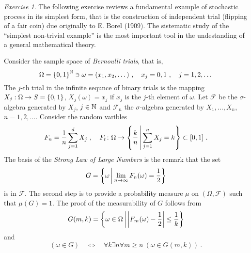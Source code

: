 \documentclass[12pt,a4paper]{amsart}
\theoremstyle{plain}
\theoremstyle{definition}
\theoremstyle{remark}
\newtheorem{exercise}[theorem]{Exercise}
\begin{document}
  \begin{exercise} The following exercise reviews a fundamental
    example of stochastic process in its simplest form, that is the
    construction of independent trial (flipping of a fair coin) due
    originally to E. Borel (1909). The sistematic study of the
    ``simplest non-trivial example'' is the most important tool in the
    undestanding of a general mathematical theory.

    Consider the sample space of \emph{Bernoulli trials}, that is,
    \begin{equation*}
      \Omega = \left\{0,1\right\}^{\mathbb{N}} \ni \omega = (x_1,x_2, \dots) \ ,
      \quad x_j = 0,1 \ , \quad j=1,2,\dots
    \end{equation*}
    The $j$-th trial in the infinite sequnce of binary trials is the
    mapping $X_j : \Omega \to S=\left\{0,1\right\}$, $X_j(\omega) = x_j$ if
    $x_j$ is the $j$-th element of $\omega$. Let $\mathcal F$ be the
    $\sigma$-algebra generated by $X_j$, $j \in \mathbb{N}$ and
    $\mathcal F_n$ the $\sigma$-algebra generated by $X_1,\dots,X_n$,
    $n=1,2,\dots$. Consider the random varibles
    \begin{equation*}
      F_n = \frac 1 n \sum_{j=1}^d X_j \ , \quad F_t \colon \Omega \to
      \left\{\frac k n \, \middle| \, \sum_{j=1}^n X_j = k \right\} \subset [0,1] \ .
    \end{equation*}
    The basis of the \emph{Strong Law of Large Numbers} is the remark
    that the set
\begin{equation*}
  G = \left\{\omega \, \middle| \, \lim_{n\to\infty} F_n(\omega) = \frac 12 \right\}
\end{equation*}
is in $\mathcal F$. The second step is to provide a probability
measure $\mu$ on $(\Omega,\mathcal F)$ such that $\mu(G) = 1$. The
proof of the measurability of $G$ follows from
\begin{equation*}
  G(m,k) = \left\{\omega \in \Omega \, \middle| \, \left\vert F_m(\omega) - \frac12 \right\vert \leq
    \frac 1k \right\}
\end{equation*}
and
\begin{equation*}
  (\omega \in G) \quad \Leftrightarrow \quad \forall k \exists n \forall
  m \geq n \ (\omega \in G(m,k)) \ . 
\end{equation*}



\end{exercise}
\end{document}
